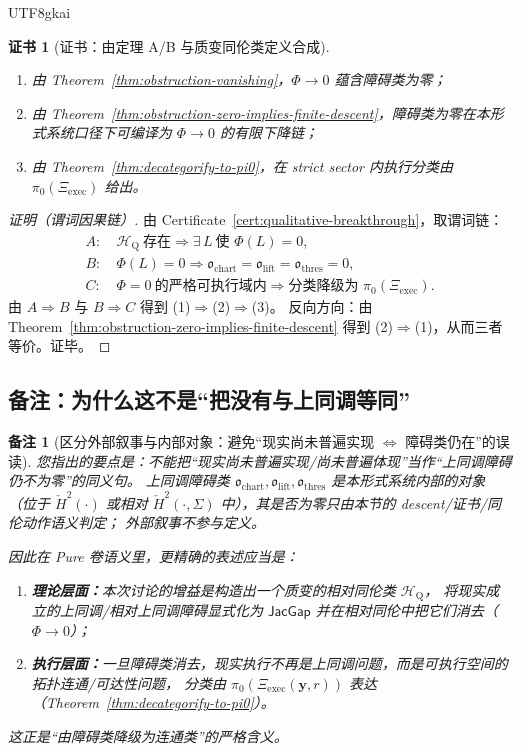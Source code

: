 \documentclass[12pt]{article}
\newtheorem{remark}{备注}[section]
\newtheorem{certificate}{证书}[section]
\newcommand{\JacGap}{\ensuremath{\mathsf{JacGap}}}
\begin{document}
\begin{CJK*}{UTF8}{gkai}
\begin{certificate}[证书：由定理 A/B 与质变同伦类定义合成]
\begin{enumerate}
  \item 由 Theorem~\ref{thm:obstruction-vanishing}，$\Phi\to 0$ 蕴含障碍类为零；
  \item 由 Theorem~\ref{thm:obstruction-zero-implies-finite-descent}，障碍类为零在本形式系统口径下可编译为 $\Phi\to 0$ 的有限下降链；
  \item 由 Theorem~\ref{thm:decategorify-to-pi0}，在 strict sector 内执行分类由 $\pi_0(\Xi_{\mathrm{exec}})$ 给出。
\end{enumerate}
\end{certificate}

\begin{proof}[证明（谓词因果链）]
由 Certificate~\ref{cert:qualitative-breakthrough}，取谓词链：
\[
\begin{aligned}
A:&\ \mathcal{H}_{\mathrm{Q}}\ \text{存在}\Rightarrow \exists\,L\ \text{使 }\Phi(L)=0,\\
B:&\ \Phi(L)=0\Rightarrow \mathfrak{o}_{\mathrm{chart}}=\mathfrak{o}_{\mathrm{lift}}=\mathfrak{o}_{\mathrm{thres}}=0,\\
C:&\ \Phi=0\ \text{的严格可执行域内}\Rightarrow \text{分类降级为 }\pi_0(\Xi_{\mathrm{exec}}).
\end{aligned}
\]
由 $A\Rightarrow B$ 与 $B\Rightarrow C$ 得到 (1)$\Rightarrow$(2)$\Rightarrow$(3)。
反向方向：由 Theorem~\ref{thm:obstruction-zero-implies-finite-descent} 得到 (2)$\Rightarrow$(1)，从而三者等价。证毕。
\end{proof}

\subsection{备注：为什么这不是“把没有与上同调等同”}

\begin{remark}[区分外部叙事与内部对象：避免“现实尚未普遍实现 $\Leftrightarrow$ 障碍类仍在”的误读]
您指出的要点是：不能把“现实尚未普遍实现/尚未普遍体现”当作“上同调障碍仍不为零”的同义句。
上同调障碍类 $\mathfrak{o}_{\mathrm{chart}},\mathfrak{o}_{\mathrm{lift}},\mathfrak{o}_{\mathrm{thres}}$ 是本形式系统内部的对象
（位于 $\check H^2(\cdot)$ 或相对 $\check H^2(\cdot,\Sigma)$ 中），其是否为零只由本节的 descent/证书/同伦动作语义判定；
外部叙事不参与定义。

因此在 Pure 卷语义里，更精确的表述应当是：
\begin{enumerate}
  \item \textbf{理论层面：}本次讨论的增益是构造出一个质变的相对同伦类 $\mathcal{H}_{\mathrm{Q}}$，
  将现实成立的上同调/相对上同调障碍显式化为 $\JacGap$ 并在相对同伦中把它们消去（$\Phi\to 0$）；
  \item \textbf{执行层面：}一旦障碍类消去，现实执行不再是上同调问题，而是可执行空间的拓扑连通/可达性问题，
  分类由 $\pi_0(\Xi_{\mathrm{exec}}(\mathbf{y},r))$ 表达（Theorem~\ref{thm:decategorify-to-pi0}）。
\end{enumerate}
这正是“由障碍类降级为连通类”的严格含义。
\end{remark}


\end{CJK*}
\end{document}
